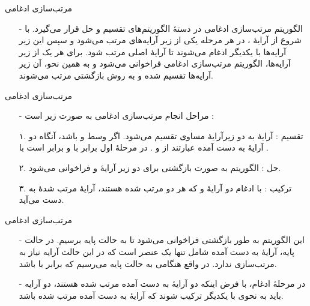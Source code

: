 
\begin{frame}{‌مرتب‌سازی ادغامی}
\begin{itemize}\itemr
\item[-]
الگوریتم مرتب‌سازی ادغامی
در دستهٔ الگوریتم‌های تقسیم و حل قرار می‌گیرد. با شروع از آرایهٔ
، در هر مرحله یکی از زیر آرایه‌های
مرتب می‌شود و سپس این زیر آرایه‌ها با یکدیگر ادغام می‌شوند تا آرایهٔ اصلی مرتب شود. برای هر یک از زیر آرایه‌ها، الگوریتم مرتب‌سازی ادغامی فراخوانی می‌شود و به همین نحو، آن زیر آرایه‌ها تقسیم شده و به روش بازگشتی مرتب می‌شوند.
\end{itemize}
\end{frame}


\begin{frame}{‌مرتب‌سازی ادغامی}
\begin{itemize}\itemr
\item[-]
مراحل انجام مرتب‌سازی ادغامی به صورت زیر است :
\item[۱.]
تقسیم : آرایهٔ
به دو زیرآرایهٔ مساوی تقسیم می‌شود. اگر 
وسط 
 و 
  باشد، آنگاه دو آرایهٔ به دست آمده عبارتند از
و
. در مرحلهٔ اول 
 برابر با 
  و 
   برابر است با 
 .
\item[۲.]
حل : الگوریتم به صورت بازگشتی برای دو زیر آرایهٔ
و
فراخوانی می‌شود.
\item[۳.]
ترکیب : با ادغام دو آرایهٔ
و
که هر دو مرتب شده هستند، آرایهٔ مرتب شدهٔ
به دست می‌آید.
\end{itemize}
\end{frame}


\begin{frame}{‌مرتب‌سازی ادغامی}
\begin{itemize}\itemr
\item[-]
این الگوریتم به طور بازگشتی فراخوانی می‌شود تا به حالت پایه برسیم.
در حالت پایه، آرایهٔ به دست آمده شامل تنها یک عنصر است که در این حالت آرایه نیاز به مرتب‌سازی ندارد. در واقع هنگامی به حالت پایه می‌رسیم که 
 برابر با 
  باشد.
\item[-]
در مرحلهٔ ادغام، با فرض اینکه دو آرایهٔ به دست آمده مرتب شده هستند، دو آرایه باید به نحوی با یکدیگر ترکیب شوند که آرایهٔ به دست آمده مرتب شده باشد.
\end{itemize}
\end{frame}


